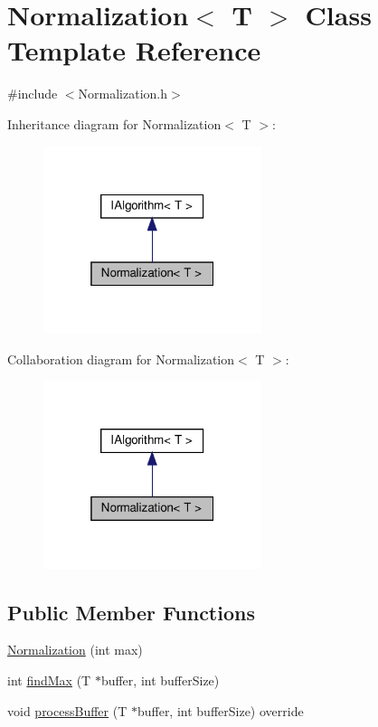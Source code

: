 \hypertarget{classNormalization}{}\section{Normalization$<$ T $>$ Class Template Reference}
\label{classNormalization}


{\ttfamily \#include $<$Normalization.\+h$>$}



Inheritance diagram for Normalization$<$ T $>$\+:
\nopagebreak
\begin{figure}[H]
\begin{center}
\leavevmode
\includegraphics[width=181pt]{d2/d5e/classNormalization__inherit__graph}
\end{center}
\end{figure}


Collaboration diagram for Normalization$<$ T $>$\+:
\nopagebreak
\begin{figure}[H]
\begin{center}
\leavevmode
\includegraphics[width=181pt]{de/d74/classNormalization__coll__graph}
\end{center}
\end{figure}
\subsection*{Public Member Functions}
\begin{DoxyCompactItemize}
\item 
\hyperlink{classNormalization_a70f7d23e000cbdd8c0067a981b44ebe9}{Normalization} (int max)
\item 
int \hyperlink{classNormalization_a0ca4f15e6f0d23ec77c2946583e248b6}{find\+Max} (T $\ast$buffer, int buffer\+Size)
\item 
void \hyperlink{classNormalization_a0f441de817c3dbb8348cb9dfd66879d7}{process\+Buffer} (T $\ast$buffer, int buffer\+Size) override
\end{DoxyCompactItemize}



